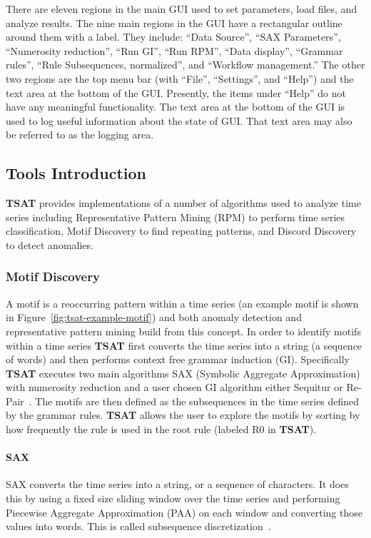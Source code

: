 \documentclass[letterpaper, 12pt]{article}
\newcommand\TSAT{\textbf{TSAT}}
\begin{document}
There are eleven regions in the main GUI used to set parameters, load files, and analyze results.  The nine main regions in the GUI have a rectangular outline around them with a label.  They include: ``Data Source'', ``SAX Parameters'', ``Numerosity reduction'', ``Run GI'', ``Run RPM'', ``Data display'', ``Grammar rules'', ``Rule Subsequences, normalized'', and ``Workflow management.''  The other two regions are the top menu bar (with ``File'', ``Settings'', and ``Help'') and the text area at the bottom of the GUI.  Presently, the items under ``Help'' do not have any meaningful functionality.  The text area at the bottom of the GUI is used to log useful information about the state of GUI.  That text area may also be referred to as the logging area.

\subsection{Tools Introduction}
{\TSAT} provides implementations of a number of algorithms used to analyze time series including Representative Pattern Mining (RPM) to perform time series classification, Motif Discovery to find repeating patterns, and Discord Discovery to detect anomalies.


\subsubsection{Motif Discovery}
A motif is a reoccurring pattern within a time series (an example motif is shown in Figure~\ref{fig:tsat-example-motif}) and both anomaly detection and representative pattern mining build from this concept.  In order to identify motifs within a time series {\TSAT} first converts the time series into a string (a sequence of words) and then performs context free grammar induction (GI).  Specifically {\TSAT} executes two main algorithms SAX (Symbolic Aggregate Approximation) with numerosity reduction and a user chosen GI algorithm either Sequitur or Re-Pair~\cite{senin-gv2,nevill1997identifying,larsson2000off}.  The motifs are then defined as the subsequences in the time series defined by the grammar rules.  {\TSAT} allows the user to explore the motifs by sorting by how frequently the rule is used in the root rule (labeled R0 in {\TSAT}).

\paragraph{SAX}SAX converts the time series into a string, or a sequence of characters.  It does this by using a fixed size sliding window over the time series and performing Piecewise Aggregate Approximation (PAA) on each window and converting those values into words.  This is called subsequence discretization~\cite{lonardi2002finding}.
\end{document}
